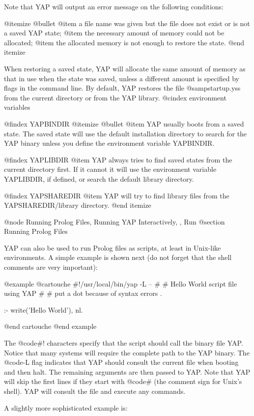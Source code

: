 {Note that YAP will output an error message on the following conditions:

@itemize @bullet
@item
a file name was given but the file does not exist or is not a saved
YAP state;
@item 
the necessary amount of memory could not be allocated;
@item
the allocated memory is not enough to restore the state.
@end itemize

When restoring a saved state, YAP will allocate the
same amount of memory as that in use when the state was saved, unless a
different amount is specified by flags in the command line. By default,
YAP restores the file @samp{startup.yss} from the current directory or from
the YAP library.
@cindex environment variables

@findex YAPBINDIR
@itemize @bullet
@item
YAP usually boots from a saved state. The saved state will use the default
installation directory to search for the YAP binary unless you define
the environment variable YAPBINDIR.

@findex YAPLIBDIR
@item
YAP always tries to find saved states from the current directory
first. If it cannot it will use the environment variable YAPLIBDIR, if
defined, or search the default library directory.

@findex YAPSHAREDIR
@item
YAP will try to find library files from the YAPSHAREDIR/library
directory.
@end itemize

@node Running Prolog Files, Running YAP Interactively, , Run
@section Running Prolog Files

YAP can also be used to run Prolog files as scripts, at least in
Unix-like environments. A simple example is shown next (do not forget
that the shell comments are very important):

@example
@cartouche
#!/usr/local/bin/yap -L --
#
# Hello World script file using YAP
#
# put a dot because of syntax errors .

:- write('Hello World'), nl.

@end cartouche
@end example

The @code{#!}  characters specify that the script should call the binary
file YAP. Notice that many systems will require the complete path to the
YAP binary. The @code{-L} flag indicates that YAP should consult the
current file when booting and then halt. The remaining arguments are
then passed to YAP. Note that YAP will skip the first lines if they
start with @code{#} (the comment sign for Unix's shell). YAP will
consult the file and execute any commands.

A slightly more sophisticated example is:

}
